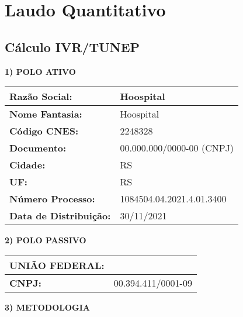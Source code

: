 \documentclass{article}
\begin{document}
    \section*{Laudo Quantitativo}
    \subsection*{Cálculo IVR/TUNEP}

    \textbf{1) POLO ATIVO}

    \begin{tabular}{|l|l|}
    \hline
    \textbf{Razão Social:} & Hoospital \\
    \hline
    \textbf{Nome Fantasia:} & Hoospital \\
    \hline
    \textbf{Código CNES:} & 2248328 \\
    \hline
    \textbf{Documento:} & 00.000.000/0000-00 (CNPJ) \\
    \hline
    \textbf{Cidade:} & RS \\
    \hline
    \textbf{UF:} & RS \\
    \hline
    \textbf{Número Processo:} & 1084504.04.2021.4.01.3400 \\
    \hline
    \textbf{Data de Distribuição:} & 30/11/2021 \\
    \hline
    \end{tabular}

    \vspace{10mm}

    \textbf{2) POLO PASSIVO}

    \begin{tabular}{|l|l|}
    \hline
    \textbf{UNIÃO FEDERAL:} & \\
    \hline
    \textbf{CNPJ:} & 00.394.411/0001-09 \\
    \hline
    \end{tabular}

    \vspace{10mm}

    \textbf{3) METODOLOGIA}
\end{document}
